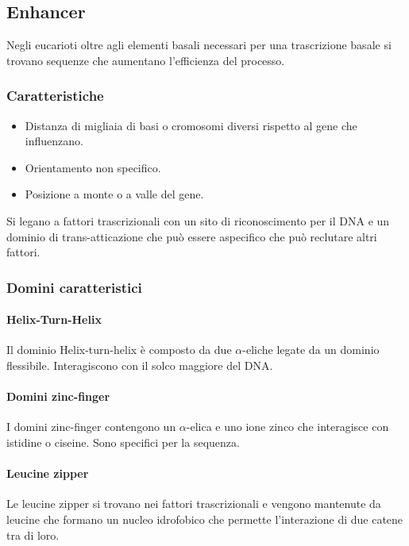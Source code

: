 	\subsection{Enhancer}
	Negli eucarioti oltre agli elementi basali necessari per una trascrizione basale si trovano sequenze che aumentano l'efficienza del processo.

		\subsubsection{Caratteristiche}
		\begin{multicols}{2}
			\begin{itemize}
				\item Distanza di migliaia di basi o cromosomi diversi rispetto al gene che influenzano.
				\item Orientamento non specifico.
				\item Posizione a monte o a valle del gene.
			\end{itemize}
		\end{multicols}
		Si legano a fattori trascrizionali con un sito di riconoscimento per il DNA e un dominio di trans-atticazione che pu\`o essere aspecifico che pu\`o reclutare altri fattori.

		\subsubsection{Domini caratteristici}

			\paragraph{Helix-Turn-Helix}
			Il dominio Helix-turn-helix \`e composto da due $\alpha$-eliche legate da un dominio flessibile.
			Interagiscono con il solco maggiore del DNA.

			\paragraph{Domini zinc-finger}
			I domini zinc-finger contengono un $\alpha$-elica e uno ione zinco che interagisce con istidine o ciseine.
			Sono specifici per la sequenza.

			\paragraph{Leucine zipper}
			Le leucine zipper si trovano nei fattori trascrizionali e vengono mantenute da leucine che formano un nucleo idrofobico che permette l'interazione di due catene tra di loro.

